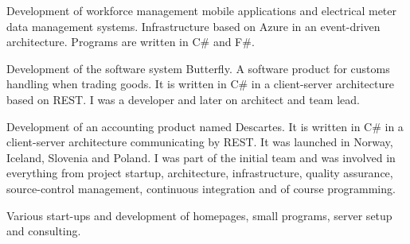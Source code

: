 \documentclass[10pt,a4paper]{altacv}
\begin{document}




\begin{fullwidth}
\makecvheader
\end{fullwidth}




Development of workforce management mobile applications and electrical meter data management systems. Infrastructure based on Azure in an event-driven architecture. Programs are written in C\# and F\#.

\divider

Development of the software system Butterfly. A software product for customs handling when trading goods. It is written in C\# in a client-server architecture based on REST. I was a developer and later on  architect and team lead.

\divider

Development of an accounting product named Descartes. It is written in C\# in a client-server architecture communicating by REST. It was launched in Norway, Iceland, Slovenia and Poland. I was part of the initial team and was involved in everything from project startup, architecture, infrastructure, quality assurance, source-control management, continuous integration and of course programming.

\divider

Various start-ups and development of homepages, small programs, server setup and consulting.

\divider
\end{document}
